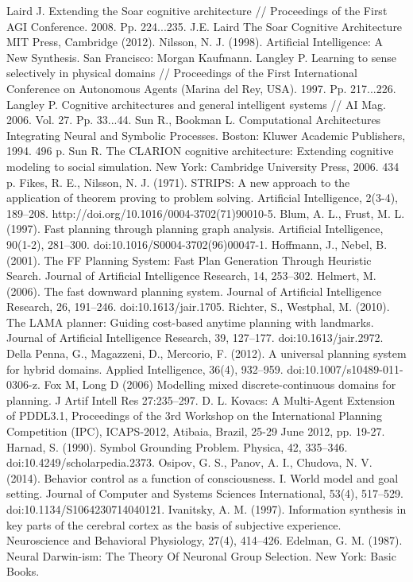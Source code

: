 \documentclass[runningheads,a4paper]{llncs}
\begin{document}
\begin{thebibliography}{4}
 Laird J. Extending the Soar cognitive architecture // Proceedings of the First AGI Conference. 2008. Pp. 224...235.
 J.E. Laird The Soar Cognitive Architecture MIT Press, Cambridge (2012).
 Nilsson, N. J. (1998). Artificial Intelligence: A New Synthesis. San Francisco: Morgan Kaufmann.
 Langley P. Learning to sense selectively in physical domains // Proceedings of the First International Conference on Autonomous Agents (Marina del Rey, USA). 1997. Pp. 217...226.
 Langley P. Cognitive architectures and general intelligent systems // AI Mag. 2006. Vol. 27. Pp.  33...44.
 Sun R., Bookman L. Computational Architectures Integrating Neural and Symbolic Processes. Boston: Kluwer Academic Publishers, 1994. 496 p.
 Sun R. The CLARION cognitive architecture: Extending cognitive modeling to social simulation. New York: Cambridge University Press, 2006. 434 p.
 Fikes, R. E., Nilsson, N. J. (1971). STRIPS: A new approach to the application of theorem proving to problem solving. Artificial Intelligence, 2(3-4), 189–208. http://doi.org/10.1016/0004-3702(71)90010-5.
 Blum, A. L., Frust, M. L. (1997). Fast planning through planning graph analysis. Artificial Intelligence, 90(1-2), 281–300. doi:10.1016/S0004-3702(96)00047-1.
 Hoffmann, J., Nebel, B. (2001). The FF Planning System: Fast Plan Generation Through Heuristic Search. Journal of Artificial Intelligence Research, 14, 253–302.
 Helmert, M. (2006). The fast downward planning system. Journal of Artificial Intelligence Research, 26, 191–246. doi:10.1613/jair.1705.
 Richter, S., Westphal, M. (2010). The LAMA planner: Guiding cost-based anytime planning with landmarks. Journal of Artificial Intelligence Research, 39, 127–177. doi:10.1613/jair.2972.
 Della Penna, G., Magazzeni, D., Mercorio, F. (2012). A universal planning system for hybrid domains. Applied Intelligence, 36(4), 932–959. doi:10.1007/s10489-011-0306-z.
 Fox M, Long D (2006) Modelling mixed discrete-continuous domains for planning. J Artif Intell Res 27:235–297.
 D. L. Kovacs: A Multi-Agent Extension of PDDL3.1, Proceedings of the 3rd Workshop on the International Planning Competition (IPC), ICAPS-2012, Atibaia, Brazil, 25-29 June 2012, pp. 19-27.
 Harnad, S. (1990). Symbol Grounding Problem. Physica, 42, 335–346. doi:10.4249/scholarpedia.2373.
 Osipov, G. S., Panov, A. I., Chudova, N. V. (2014). Behavior control as a function of consciousness. I. World model and goal setting. Journal of Computer and Systems Sciences International, 53(4), 517–529. doi:10.1134/S1064230714040121.
 Ivanitsky, A. M. (1997). Information synthesis in key parts of the cerebral cortex as the basis of subjective experience. Neuroscience and Behavioral Physiology, 27(4), 414–426.
 Edelman, G. M. (1987). Neural Darwin-ism: The Theory Of Neuronal Group Selection. New York: Basic Books.


\end{thebibliography}
\end{document}
